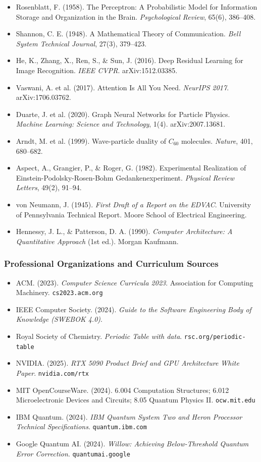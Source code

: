 \documentclass[11pt,letterpaper]{article}
\begin{document}
\begin{itemize}[leftmargin=*]
  \item Rosenblatt, F. (1958). The Perceptron: A Probabilistic Model for Information Storage and Organization in the Brain. \textit{Psychological Review}, 65(6), 386--408.
  \item Shannon, C. E. (1948). A Mathematical Theory of Communication. \textit{Bell System Technical Journal}, 27(3), 379--423.
  \item He, K., Zhang, X., Ren, S., \& Sun, J. (2016). Deep Residual Learning for Image Recognition. \textit{IEEE CVPR}. arXiv:1512.03385.
  \item Vaswani, A. et al. (2017). Attention Is All You Need. \textit{NeurIPS 2017}. arXiv:1706.03762.
  \item Duarte, J. et al. (2020). Graph Neural Networks for Particle Physics. \textit{Machine Learning: Science and Technology}, 1(4). arXiv:2007.13681.
  \item Arndt, M. et al. (1999). Wave-particle duality of $C_{60}$ molecules. \textit{Nature}, 401, 680--682.
  \item Aspect, A., Grangier, P., \& Roger, G. (1982). Experimental Realization of Einstein-Podolsky-Rosen-Bohm Gedankenexperiment. \textit{Physical Review Letters}, 49(2), 91--94.
  \item von Neumann, J. (1945). \textit{First Draft of a Report on the EDVAC}. University of Pennsylvania Technical Report. Moore School of Electrical Engineering.
  \item Hennessy, J. L., \& Patterson, D. A. (1990). \textit{Computer Architecture: A Quantitative Approach} (1st ed.). Morgan Kaufmann.
\end{itemize}

\subsubsection{Professional Organizations and Curriculum Sources}

\begin{itemize}[leftmargin=*]
  \item ACM. (2023). \textit{Computer Science Curricula 2023}. Association for Computing Machinery. \texttt{cs2023.acm.org}
  \item IEEE Computer Society. (2024). \textit{Guide to the Software Engineering Body of Knowledge (SWEBOK 4.0)}.
  \item Royal Society of Chemistry. \textit{Periodic Table with data}. \texttt{rsc.org/periodic-table}
  \item NVIDIA. (2025). \textit{RTX 5090 Product Brief and GPU Architecture White Paper}. \texttt{nvidia.com/rtx}
  \item MIT OpenCourseWare. (2024). 6.004 Computation Structures; 6.012 Microelectronic Devices and Circuits; 8.05 Quantum Physics II. \texttt{ocw.mit.edu}
  \item IBM Quantum. (2024). \textit{IBM Quantum System Two and Heron Processor Technical Specifications}. \texttt{quantum.ibm.com}
  \item Google Quantum AI. (2024). \textit{Willow: Achieving Below-Threshold Quantum Error Correction}. \texttt{quantumai.google}
\end{itemize}
\end{document}
